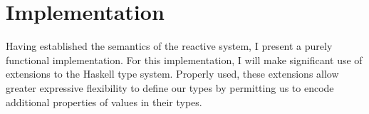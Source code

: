 \chapter{Implementation}
\label{chapter:Implementation}

Having established the semantics of the reactive system, I present a purely 
functional implementation. For this implementation, I will make significant use
of extensions to the Haskell type system. Properly used, these extensions allow
greater expressive flexibility to define our types by permitting us to encode
additional properties of values in their types.





